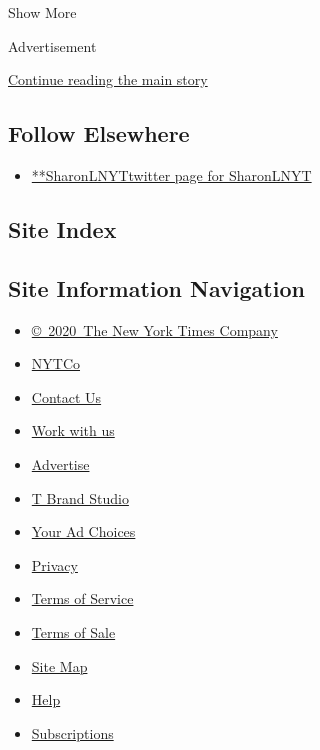 Show More

Advertisement

\protect\hyperlink{after-mid2}{Continue reading the main story}

\hypertarget{follow-elsewhere}{%
\subsection{Follow Elsewhere}\label{follow-elsewhere}}

\begin{itemize}
\tightlist
\item
  \href{https://twitter.com/SharonLNYT}{**SharonLNYTtwitter page for
  SharonLNYT}
\end{itemize}

\hypertarget{site-index}{%
\subsection{Site Index}\label{site-index}}

\hypertarget{site-information-navigation}{%
\subsection{Site Information
Navigation}\label{site-information-navigation}}

\begin{itemize}
\tightlist
\item
  \href{https://help.nytimes.com/hc/en-us/articles/115014792127-Copyright-notice}{©~2020~The
  New York Times Company}
\end{itemize}

\begin{itemize}
\tightlist
\item
  \href{https://www.nytco.com/}{NYTCo}
\item
  \href{https://help.nytimes.com/hc/en-us/articles/115015385887-Contact-Us}{Contact
  Us}
\item
  \href{https://www.nytco.com/careers/}{Work with us}
\item
  \href{https://nytmediakit.com/}{Advertise}
\item
  \href{http://www.tbrandstudio.com/}{T Brand Studio}
\item
  \href{https://www.nytimes.com/privacy/cookie-policy\#how-do-i-manage-trackers}{Your
  Ad Choices}
\item
  \href{https://www.nytimes.com/privacy}{Privacy}
\item
  \href{https://help.nytimes.com/hc/en-us/articles/115014893428-Terms-of-service}{Terms
  of Service}
\item
  \href{https://help.nytimes.com/hc/en-us/articles/115014893968-Terms-of-sale}{Terms
  of Sale}
\item
  \href{https://spiderbites.nytimes.com}{Site Map}
\item
  \href{https://help.nytimes.com/hc/en-us}{Help}
\item
  \href{https://www.nytimes.com/subscription?campaignId=37WXW}{Subscriptions}
\end{itemize}
